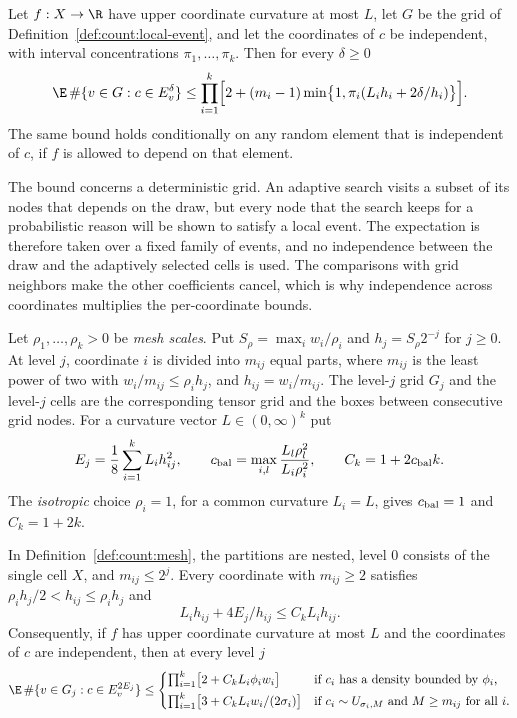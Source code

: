 \begin{theorem}\label{thm:count:local}
Let $f:X\to\R$ have upper coordinate curvature at most $L$, let $G$ be the
grid of Definition~\ref{def:count:local-event}, and let the coordinates of
$c$ be independent, with interval concentrations $\pi_1,\dots,\pi_k$. Then
for every $\delta\ge0$
\[
 \E\,\#\{v\in G: c\in E_v^\delta\}
 \le\prod_{i=1}^k\Bigl[2+(m_i-1)\min\bigl\{1,\pi_i(L_ih_i+2\delta/h_i)\bigr\}\Bigr].
\]
The same bound holds conditionally on any random element that is
independent of $c$, if $f$ is allowed to depend on that element.
\end{theorem}

The bound concerns a deterministic grid. An adaptive search visits a subset
of its nodes that depends on the draw, but every node that the search keeps
for a probabilistic reason will be shown to satisfy a local event. The
expectation is therefore taken over a fixed family of events, and no
independence between the draw and the adaptively selected cells is used.
The comparisons with grid neighbors make the other coefficients cancel, which
is why independence across coordinates multiplies the per-coordinate bounds.

\begin{definition}\label{def:count:mesh}
Let $\rho_1,\dots,\rho_k>0$ be \emph{mesh scales}. Put
$S_\rho=\max_iw_i/\rho_i$ and $h_j=S_\rho2^{-j}$ for $j\ge0$. At level $j$,
coordinate $i$ is divided into $m_{ij}$ equal parts, where $m_{ij}$ is the
least power of two with $w_i/m_{ij}\le\rho_ih_j$, and $h_{ij}=w_i/m_{ij}$.
The level-$j$ grid $G_j$ and the level-$j$ cells are the corresponding
tensor grid and the boxes between consecutive grid nodes. For a curvature
vector $L\in(0,\infty)^k$ put
\[
 E_j=\frac18\sum_{i=1}^kL_ih_{ij}^2,
 \qquad
 c_{\rm bal}=\max_{i,l}\frac{L_l\rho_l^2}{L_i\rho_i^2},
 \qquad
 C_k=1+2c_{\rm bal}k .
\]
The \emph{isotropic} choice $\rho_i=1$, for a common curvature $L_i=L$, gives
$c_{\rm bal}=1$ and $C_k=1+2k$.
\end{definition}

\begin{corollary}\label{cor:count:levels}
In Definition~\ref{def:count:mesh}, the partitions are nested, level $0$
consists of the single cell $X$, and $m_{ij}\le2^j$. Every coordinate with
$m_{ij}\ge2$ satisfies $\rho_ih_j/2<h_{ij}\le\rho_ih_j$ and
\[
 L_ih_{ij}+4E_j/h_{ij}\le C_kL_ih_{ij}.
\]
Consequently, if $f$ has upper coordinate curvature at most $L$ and the
coordinates of $c$ are independent, then at every level $j$
\[
 \E\,\#\{v\in G_j:c\in E_v^{2E_j}\}\le
 \begin{cases}
 \prod_{i=1}^k\bigl[2+C_kL_i\phi_iw_i\bigr]
 &\text{if $c_i$ has a density bounded by $\phi_i$,}\\[3pt]
 \prod_{i=1}^k\bigl[3+C_kL_iw_i/(2\sigma_i)\bigr]
 &\text{if $c_i\sim U_{\sigma_i,M}$ and $M\ge m_{ij}$ for all $i$.}
 \end{cases}
\]
\end{corollary}


